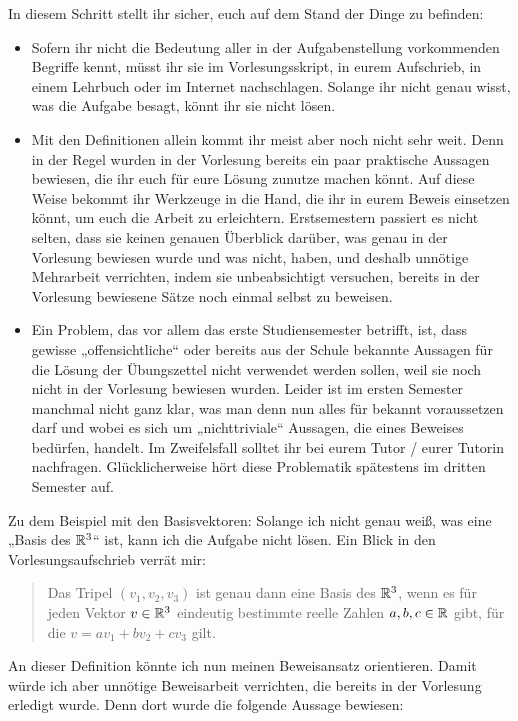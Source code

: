  
\begin{de}
    In diesem Schritt stellt ihr sicher, euch auf dem Stand der Dinge zu befinden:
    \begin{itemize}
        \item Sofern ihr nicht die Bedeutung aller in der Aufgabenstellung vorkommenden Begriffe kennt, müsst ihr sie im Vorlesungsskript, in eurem Aufschrieb, in einem Lehrbuch oder im Internet nachschlagen. Solange ihr nicht genau wisst, was die Aufgabe besagt, könnt ihr sie nicht lösen.
        \item Mit den Definitionen allein kommt ihr meist aber noch nicht sehr weit. Denn in der Regel wurden in der Vorlesung bereits ein paar praktische Aussagen bewiesen, die ihr euch für eure Lösung zunutze machen könnt. Auf diese Weise bekommt ihr Werkzeuge in die Hand, die ihr in eurem Beweis einsetzen könnt, um euch die Arbeit zu erleichtern. Erstsemestern passiert es nicht selten, dass sie keinen genauen Überblick darüber, was genau in der Vorlesung bewiesen wurde und was nicht, haben, und deshalb unnötige Mehrarbeit verrichten, indem sie unbeabsichtigt versuchen, bereits in der Vorlesung bewiesene Sätze noch einmal selbst zu beweisen.
        \item Ein Problem, das vor allem das erste Studiensemester betrifft, ist, dass gewisse „offensichtliche“ oder bereits aus der Schule bekannte Aussagen für die Lösung der Übungszettel nicht verwendet werden sollen, weil sie noch nicht in der Vorlesung bewiesen wurden. Leider ist im ersten Semester manchmal nicht ganz klar, was man denn nun alles für bekannt voraussetzen darf und wobei es sich um „nichttriviale“ Aussagen, die eines Beweises bedürfen, handelt. Im Zweifelsfall solltet ihr bei eurem Tutor / eurer Tutorin nachfragen. Glücklicherweise hört diese Problematik spätestens im dritten Semester auf.
    \end{itemize}
    Zu dem Beispiel mit den Basisvektoren: Solange ich nicht genau weiß, was eine „Basis des $\mathbb R^3$“ ist, kann ich die Aufgabe nicht lösen. Ein Blick in den Vorlesungsaufschrieb verrät mir:
    \begin{quote}
        Das Tripel $(v_1,v_2,v_3)$ ist genau dann eine Basis des $\mathbb R^3$, wenn es für jeden Vektor $v\in \mathbb R^3$ eindeutig bestimmte reelle Zahlen $a,b,c\in \mathbb R$ gibt, für die $v=av_1+bv_2+cv_3$ gilt.
    \end{quote}
    An dieser Definition könnte ich nun meinen Beweisansatz orientieren. Damit würde ich aber unnötige Beweisarbeit verrichten, die bereits in der Vorlesung erledigt wurde. Denn dort wurde die folgende Aussage bewiesen:

\end{de}
